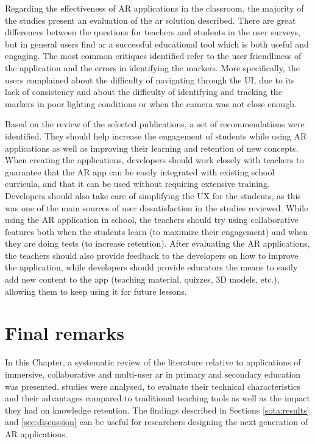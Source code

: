 Regarding the effectiveness of AR applications in the classroom, the majority of the studies present an evaluation of the \gls{ar} solution described. There are great differences between the questions for teachers and students in the user surveys, but in general users find \gls{ar} a successful educational tool which is both useful and engaging. The most common critiques identified refer to the user friendliness of the application and the errors in identifying the markers. More specifically, the users complained about the difficulty of navigating through the UI, due to its lack of consistency and about the difficulty of identifying and tracking the markers in poor lighting conditions or when the camera was not close enough.

Based on the review of the selected publications, a set of recommendations were identified. They should help increase the engagement of students while using AR applications as well as improving their learning and retention of new concepts. When creating the applications, developers should work closely with teachers to guarantee that the AR app can be easily integrated with existing school curricula, and that it can be used without requiring extensive training. Developers should also take care of simplifying the UX for the students, as this was one of the main sources of user dissatisfaction in the studies reviewed. While using the AR application in school, the teachers should try using collaborative features both when the students learn (to maximize their engagement) and when they are doing tests (to increase retention). After evaluating the AR applications, the teachers should also provide feedback to the developers on how to improve the application, while developers should provide educators the means to easily add new content to the app (teaching material, quizzes, 3D models, etc.), allowing them to keep using it for future lessons.

\section{Final remarks} \label{sota:conclusions}
In this Chapter, a systematic review of the literature relative to applications of immersive, collaborative and multi-user \gls{ar} in primary and secondary education was presented. \papersSelected studies were analysed, to evaluate their technical characteristics and their advantages compared to traditional teaching tools as well as the impact they had on knowledge retention. The findings described in Sections \ref{sota:results} and \ref{sec:discussion} can be useful for researchers designing the next generation of AR applications.

